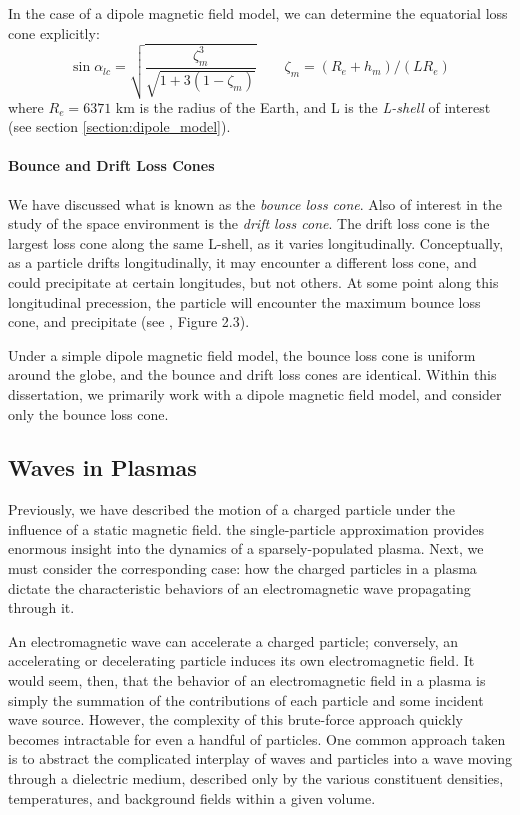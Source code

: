 In the case of a dipole magnetic field model, we can determine the equatorial loss cone explicitly:
\begin{equation}
\sin \alpha_{lc} = \sqrt{\frac{\zeta_m^3}{\sqrt{1 + 3 (1 - \zeta_m)}}} \qquad \zeta_m = (R_e + h_m) / (L R_e)
\end{equation}
where $R_e = 6371$ km is the radius of the Earth, and L is the \emph{L-shell} of interest (see section \ref{section:dipole_model}).



\paragraph{Bounce and Drift Loss Cones}
We have discussed what is known as the \emph{bounce loss cone}. Also of interest in the study of the space environment is the \emph{drift loss cone}. The drift loss cone is the largest loss cone along the same L-shell, as it varies longitudinally. Conceptually, as a particle drifts longitudinally, it may encounter a different loss cone, and could precipitate at certain longitudes, but not others. At some point along this longitudinal precession, the particle will encounter the maximum bounce loss cone, and precipitate (see \cite{Cotts2011}, Figure 2.3). 

Under a simple dipole magnetic field model, the bounce loss cone is uniform around the globe, and the bounce and drift loss cones are identical. Within this dissertation, we primarily work with a dipole magnetic field model, and consider only the bounce loss cone.

\subsection{Waves in Plasmas}
\label{section:waves_in_plasmas}
Previously, we have described the motion of a charged particle under the influence of a static magnetic field. the single-particle approximation provides enormous insight into the dynamics of a sparsely-populated plasma. Next, we must consider the corresponding case: how the charged particles in a plasma dictate the characteristic behaviors of an electromagnetic wave propagating through it.

An electromagnetic wave can accelerate a charged particle; conversely, an accelerating or decelerating particle induces its own electromagnetic field. It would seem, then, that the behavior of an electromagnetic field in a plasma is simply the summation of the contributions of each particle and some incident wave source. However, the complexity of this brute-force approach quickly becomes intractable for even a handful of particles. One common approach taken is to abstract the complicated interplay of waves and particles into a wave moving through a dielectric medium, described only by the various constituent densities, temperatures, and background fields within a given volume. 

